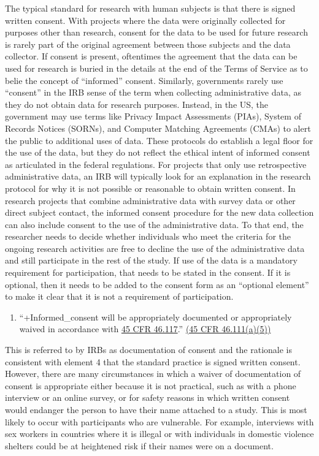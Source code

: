 \documentclass[
]{WileySix}
\providecommand{\tightlist}{%
  \setlength{\itemsep}{0pt}\setlength{\parskip}{0pt}}
\begin{document}
The typical standard for research with human subjects is that there is signed written consent. With projects where the data were originally collected for purposes other than research, consent for the data to be used for future research is rarely part of the original agreement between those subjects and the data collector. If consent is present, oftentimes the agreement that the data can be used for research is buried in the details at the end of the Terms of Service as to belie the concept of ``informed'' consent. Similarly, governments rarely use ``consent'' in the IRB sense of the term when collecting administrative data, as they do not obtain data for research purposes. Instead, in the US, the government may use terms like Privacy Impact Assessments (PIAs), System of Records Notices (SORNs), and Computer Matching Agreements (CMAs) to alert the public to additional uses of data. These protocols do establish a legal floor for the use of the data, but they do not reflect the ethical intent of informed consent as articulated in the federal regulations. For projects that only use retrospective administrative data, an IRB will typically look for an explanation in the research protocol for why it is not possible or reasonable to obtain written consent. In research projects that combine administrative data with survey data or other direct subject contact, the informed consent procedure for the new data collection can also include consent to the use of the administrative data. To that end, the researcher needs to decide whether individuals who meet the criteria for the ongoing research activities are free to decline the use of the administrative data and still participate in the rest of the study. If use of the data is a mandatory requirement for participation, that needs to be stated in the consent. If it is optional, then it needs to be added to the consent form as an ``optional element'' to make it clear that it is not a requirement of participation.

\begin{enumerate}
\def\labelenumi{(\arabic{enumi})}
\setcounter{enumi}{4}
\tightlist
\item
  ``+Informed\_consent\textbar{} will be appropriately documented or appropriately waived in accordance with \href{https://www.law.cornell.edu/cfr/text/45/46.117}{45 CFR 46.117}.'' \href{https://www.law.cornell.edu/cfr/text/45/46.111}{(45 CFR 46.111(a)(5))}
\end{enumerate}

This is referred to by IRBs as documentation of consent and the rationale is consistent with element 4 that the standard practice is signed written consent. However, there are many circumstances in which a waiver of documentation of consent is appropriate either because it is not practical, such as with a phone interview or an online survey, or for safety reasons in which written consent would endanger the person to have their name attached to a study. This is most likely to occur with participants who are vulnerable. For example, interviews with sex workers in countries where it is illegal or with individuals in domestic violence shelters could be at heightened risk if their names were on a document.
\end{document}
